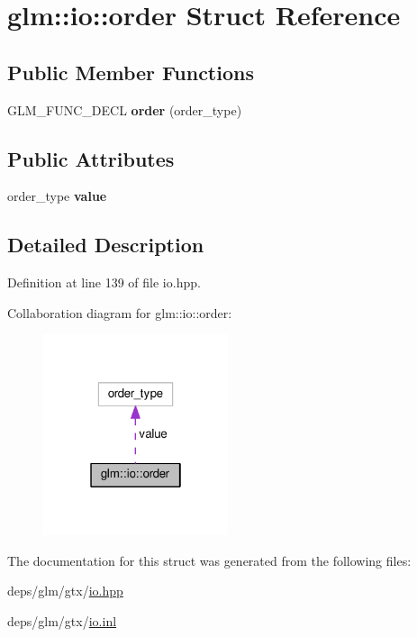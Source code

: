 \hypertarget{structglm_1_1io_1_1order}{}\section{glm\+:\+:io\+:\+:order Struct Reference}
\label{structglm_1_1io_1_1order}
\subsection*{Public Member Functions}
\begin{DoxyCompactItemize}
\item 
\mbox{\label{structglm_1_1io_1_1order_a06813d404c975865fdd3a77146268a1f}} 
G\+L\+M\+\_\+\+F\+U\+N\+C\+\_\+\+D\+E\+CL {\bfseries order} (order\+\_\+type)
\end{DoxyCompactItemize}
\subsection*{Public Attributes}
\begin{DoxyCompactItemize}
\item 
\mbox{\label{structglm_1_1io_1_1order_aa8788dd0568bacd081d02bd5aca9889b}} 
order\+\_\+type {\bfseries value}
\end{DoxyCompactItemize}


\subsection{Detailed Description}


Definition at line 139 of file io.\+hpp.



Collaboration diagram for glm\+:\+:io\+:\+:order\+:
\nopagebreak
\begin{figure}[H]
\begin{center}
\leavevmode
\includegraphics[width=154pt]{d1/d12/structglm_1_1io_1_1order__coll__graph}
\end{center}
\end{figure}


The documentation for this struct was generated from the following files\+:\begin{DoxyCompactItemize}
\item 
deps/glm/gtx/\hyperlink{io_8hpp}{io.\+hpp}\item 
deps/glm/gtx/\hyperlink{io_8inl}{io.\+inl}\end{DoxyCompactItemize}
